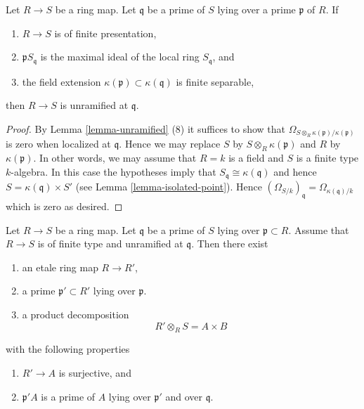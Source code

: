 \begin{lemma}
\label{lemma-characterize-unramified}
Let $R \to S$ be a ring map. Let $\mathfrak q$ be a prime of $S$
lying over a prime $\mathfrak p$ of $R$. If
\begin{enumerate}
\item $R \to S$ is of finite presentation,
\item $\mathfrak p S_{\mathfrak q}$ is the maximal ideal
of the local ring $S_{\mathfrak q}$, and
\item the field extension $\kappa(\mathfrak p) \subset \kappa(\mathfrak q)$
is finite separable,
\end{enumerate}
then $R \to S$ is unramified at $\mathfrak q$.
\end{lemma}

\begin{proof}
By Lemma \ref{lemma-unramified} (8) it suffices to show that
$\Omega_{S \otimes_R \kappa(\mathfrak p) / \kappa(\mathfrak p)}$
is zero when localized at $\mathfrak q$. Hence we may replace $S$
by $S \otimes_R \kappa(\mathfrak p)$ and $R$ by $\kappa(\mathfrak p)$.
In other words, we may assume that $R = k$ is a field and $S$
is a finite type $k$-algebra.
In this case the hypotheses imply that
$S_{\mathfrak q} \cong \kappa(\mathfrak q)$
and hence $S = \kappa(\mathfrak q) \times S'$ (see
Lemma \ref{lemma-isolated-point}).
Hence $(\Omega_{S/k})_{\mathfrak q} = \Omega_{\kappa(\mathfrak q)/k}$
which is zero as desired.
\end{proof}

\begin{lemma}
\label{lemma-etale-makes-unramfied-closed-at-prime}
Let $R \to S$ be a ring map.
Let $\mathfrak q$ be a prime of $S$ lying over $\mathfrak p \subset R$.
Assume that $R \to S$ is of finite type and unramified at $\mathfrak q$.
Then there exist
\begin{enumerate}
\item an etale ring map $R \to R'$,
\item a prime $\mathfrak p' \subset R'$ lying over $\mathfrak p$.
\item a product decomposition
$$
R' \otimes_R S = A \times B
$$
\end{enumerate}
with the following properties
\begin{enumerate}
\item $R' \to A$ is surjective, and
\item $\mathfrak p'A$ is a prime of $A$ lying over $\mathfrak p'$ and
over $\mathfrak q$.
\end{enumerate}
\end{lemma}

